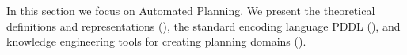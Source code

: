 In this section we focus on Automated Planning.
We present the theoretical definitions and representations (), the standard encoding language PDDL (), and knowledge engineering tools for creating planning domains ().



%